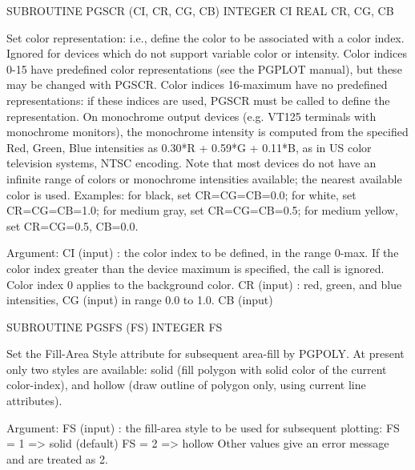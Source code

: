 {\eightpoint\begintt
      SUBROUTINE PGSCR (CI, CR, CG, CB)
      INTEGER CI
      REAL    CR, CG, CB
 
Set color representation: i.e., define the color to be
associated with a color index.  Ignored for devices which do not
support variable color or intensity.  Color indices 0-15
have predefined color representations (see the PGPLOT manual), but
these may be changed with PGSCR.  Color indices 16-maximum have no
predefined representations: if these indices are used, PGSCR must
be called to define the representation. On monochrome output
devices (e.g. VT125 terminals with monochrome monitors), the
monochrome intensity is computed from the specified Red, Green, Blue
intensities as 0.30*R + 0.59*G + 0.11*B, as in US color television
systems, NTSC encoding.  Note that most devices do not have an
infinite range of colors or monochrome intensities available;
the nearest available color is used.  Examples: for black,
set CR=CG=CB=0.0; for white, set CR=CG=CB=1.0; for medium gray,
set CR=CG=CB=0.5; for medium yellow, set CR=CG=0.5, CB=0.0.
 
Argument:
 CI     (input)  : the color index to be defined, in the range 0-max.
                   If the color index greater than the device
                   maximum is specified, the call is ignored. Color
                   index 0 applies to the background color.
 CR     (input)  : red, green, and blue intensities,
 CG     (input)    in range 0.0 to 1.0.
 CB     (input)
\endtt}

{\eightpoint\begintt
      SUBROUTINE PGSFS (FS)
      INTEGER  FS
 
Set the Fill-Area Style attribute for subsequent area-fill by
PGPOLY.  At present only two styles are available: solid (fill
polygon with solid color of the current color-index), and hollow
(draw outline of polygon only, using current line attributes).
 
Argument:
 FS     (input)  : the fill-area style to be used for subsequent
                   plotting:
                     FS = 1 => solid (default)
                     FS = 2 => hollow
                   Other values give an error message and are
                   treated as 2.
\endtt}

